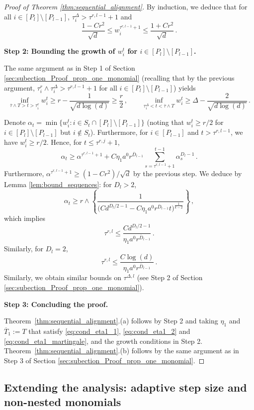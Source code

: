 \documentclass[11pt]{article}
\newcommand{\<}{\langle}
\renewcommand{\>}{\rangle}
\theoremstyle{definition}
\def\oT{\overline{T}}
\def\oD{\overline{D}}
\def\otau{\overline{\tau}}
\def\oD{\overline{D}}
\begin{document}
\begin{proof}[Proof of Theorem \ref{thm:sequential_alignment}]
By induction, we deduce that for all $i \in [P_l] \setminus [P_{l-1}]$, $\tau^{\Delta}_i > \tau^{r,l-1} +1$ and
\[
\frac{1 - Cr^2}{\sqrt{d}}  \leq w_i^{\tau^{r,l-1} +1} \leq \frac{1 + Cr^2}{\sqrt{d}}\, .
\]

\noindent
\textbf{Step 2: Bounding the growth of $w_i^t$ for $i \in [P_l]\setminus [P_{l-1}]$.}

The same argument as in Step 1 of Section \ref{sec:subection_Proof_prop_one_monomial} (recalling that by the previous argument, $\tau^{r}_i \wedge \tau^{\Delta}_i > \tau^{r,l-1} +1$ for all $i \in [P_l]\setminus [P_{l-1}]$) yields
\[
\inf_{\otau \wedge T >t > \tau_i^r} w_i^t \geq r - \frac{1}{\sqrt{d\log(d)}} \geq \frac{r}{2}  \, , \qquad \inf_{\tau_i^\Delta < t < \otau \wedge T} w_i^t \geq \Delta - \frac{2}{\sqrt{d \log (d)}} \, .
\]

Denote $\alpha_t = \min \{ w_i^t : i \in S_t \cap [P_l] \setminus [P_{l-1}] \}$ (noting that $w_i^t \geq r/2$ for $i \in [P_l] \setminus [P_{l-1}]$ but $i\not\in S_t$). Furthermore, for $i \in [P_{l-1}]$ and $t > \tau^{r,l-1}$, we have $w_i^t \geq r/2$. Hence, for $t \leq \tau^{r,j} +1$,
\[
\alpha_t \geq \alpha^{\tau^{r,l-1}+1} + C \eta_1 a^0 r^{\oD_{l-1}} \sum_{s = \tau^{r,l-1}+1}^{t-1} \alpha_s^{D_l-1}\, .
\]
Furthermore, $\alpha^{\tau^{r,l-1}+1} \geq (1 - Cr^2)/\sqrt{d}$ by the previous step.
We deduce by Lemma \ref{lem:bound_sequences}: for $D_l> 2$,
\[
\alpha_t \geq r \wedge \left\{ \frac{1}{\big( C d^{D_l/2 - 1} - C \eta_1 a^0  r^{\oD_{l-1}}  t \big)^{\frac{1}{k-2}} } \right\} \, ,
\]
which implies
\[
\tau^{r,l} \leq \frac{C d^{D_l/2-1}}{\eta_1 a^0  r^{\oD_{l-1}}} \, .
\]
Similarly, for $D_l = 2$,
\[
\tau^{r,l} \leq \frac{C \log(d)}{\eta_1 a^0  r^{\oD_{l-1}}} \, .
\]
Similarly, we obtain similar bounds on $\tau^{\Delta,l}$ (see Step 2 of Section \ref{sec:subection_Proof_prop_one_monomial}). 


\noindent
\textbf{Step 3: Concluding the proof.}


Theorem~\ref{thm:sequential_alignment}.(a) follows by Step 2 and taking $\eta_1$ and $\oT_1 :=T$ that satisfy \eqref{eq:cond_eta1_1}, \eqref{eq:cond_eta1_2} and \eqref{eq:cond_eta1_martingale}, and the growth conditions in Step 2. Theorem~\ref{thm:sequential_alignment}.(b) follows by the same argument as in Step 3 of Section \ref{sec:subection_Proof_prop_one_monomial}.
\end{proof}




\subsection{Extending the analysis: adaptive step size and non-nested monomials}\label{app:extending_analysis}
\end{document}
